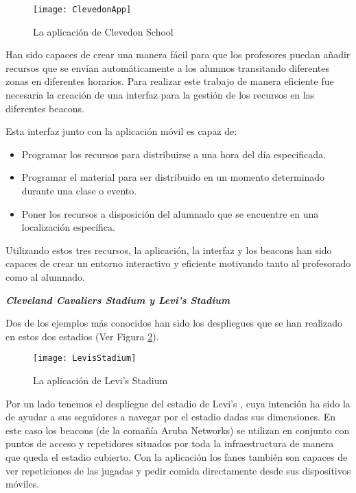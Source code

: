 \begin{figure}[H]
	\centering
	\texttt{[image: ClevedonApp]}
	\caption{La aplicación de Clevedon School}
	\label{fig:clevedonApp}
\end{figure}


Han sido capaces de crear una manera fácil para que los profesores puedan añadir recursos que se envían automáticamente a los alumnos transitando diferentes zonas en diferentes horarios. Para realizar este trabajo de manera eficiente fue necesaria la creación de una interfaz para la gestión de los recursos en las diferentes beacons.


Esta interfaz junto con la aplicación móvil es capaz de: 

\begin{itemize}
\item Programar los recursos para distribuirse a una hora del día especificada. 
\item Programar el material para ser distribuido en un momento determinado durante una clase o evento. 
\item Poner los recursos a disposición del alumnado que se encuentre en una localización específica.
\end{itemize}

Utilizando estos tres recursos, la aplicación, la interfaz y los beacons han sido capaces de crear un entorno interactivo y eficiente motivando tanto al profesorado como al alumnado. 

\vspace{5mm}

\textsl{\textbf{{Cleveland Cavaliers Stadium y Levi's Stadium}}}

\vspace{2mm}

Dos de los ejemplos más conocidos han sido los despliegues que se han realizado en estos dos estadios (Ver Figura \ref{fig:levisStadium}). 

\begin{figure}[H]
	\centering
	\texttt{[image: LevisStadium]}
	\caption{La aplicación de Levi's Stadium}
	\label{fig:levisStadium}
\end{figure}

Por un lado tenemos el despliegue del estadio de Levi's , cuya intención ha sido la de ayudar a sus seguidores a navegar por el estadio dadas sus dimensiones. En este caso los beacons (de la comañía Aruba Networks) se utilizan en conjunto con puntos de acceso y repetidores situados por toda la infraestructura de manera que queda el estadio cubierto. Con la aplicación los fanes también son capaces de ver repeticiones de las jugadas y pedir comida directamente desde sus dispositivos móviles.



